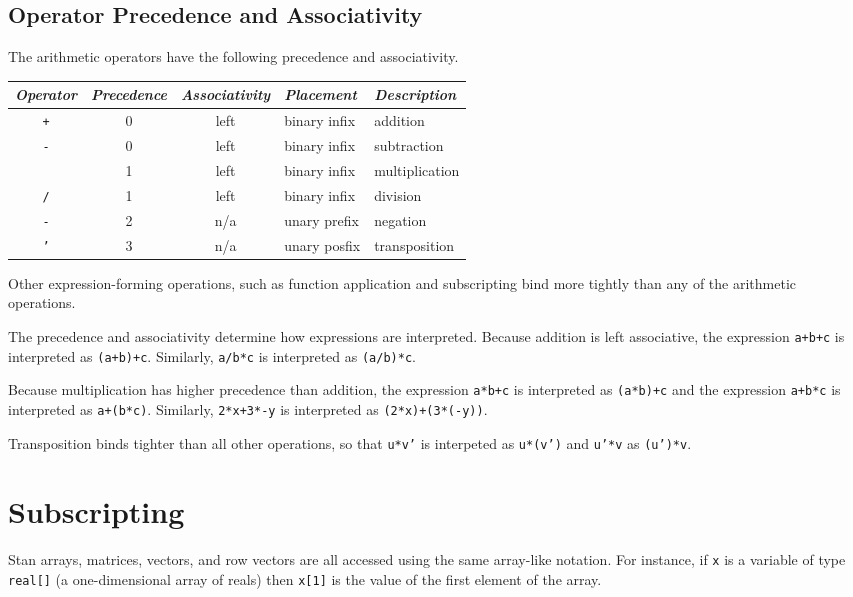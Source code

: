 \documentclass[10pt]{report}
\newcommand{\Stan}{Stan\xspace}
\newcommand{\code}[1]{{\tt #1}}
\begin{document}
\subsection{Operator Precedence and Associativity}

The arithmetic operators have the following precedence and
associativity.
%
\begin{center}
\begin{tabular}{c|ccl|l}
{\it Operator} & {\it Precedence} & {\it Associativity} & {\it
  Placement} & {\it Description}
\\ \hline \hline
\code{+} & 0 & left & binary infix & addition
\\
\code{-} & 0 & left & binary infix & subtraction
\\ \hline
\code{*} & 1 & left & binary infix & multiplication
\\
\code{/} & 1 & left & binary infix & division
\\ \hline
\code{-} & 2 & n/a & unary prefix & negation
\\ \hline
\code{'} & 3 & n/a & unary posfix & transposition
\end{tabular}
\end{center}
%
Other expression-forming operations, such as function application and
subscripting bind more tightly than any of the arithmetic operations.  

The precedence and associativity determine how expressions are
interpreted.  Because addition is left associative, the expression
\code{a+b+c} is interpreted as \code{(a+b)+c}.  Similarly,
\code{a/b*c} is interpreted as \code{(a/b)*c}.  

Because multiplication has higher precedence than addition, the
expression \code{a*b+c} is interpreted as \code{(a*b)+c} and the
expression \code{a+b*c} is interpreted as \code{a+(b*c)}.  Similarly,
\code{2*x+3*-y} is interpreted as \code{(2*x)+(3*(-y))}.

Transposition binds tighter than all other operations, so that
\code{u*v'} is interpeted as \code{u*(v')} and \code{u'*v} as
\code{(u')*v}.

\section{Subscripting}

\Stan arrays, matrices, vectors, and row vectors are all accessed
using the same array-like notation.  For instance, if \code{x} is a
variable of type \code{real[]} (a one-dimensional array of reals)
then \code{x[1]} is the value of the first element of the
array.  
\end{document}
